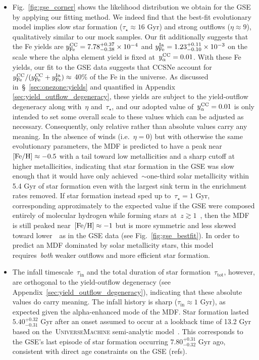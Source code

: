 \documentclass[ms.tex]{subfiles}
\begin{document}
\begin{itemize}
	\item Fig.~\ref{fig:gse_corner} shows the likelihood distribution we obtain
	for the GSE by applying our fitting method.
	We indeed find that the best-fit evolutionary model implies slow star
	formation ($\tau_\star \approx 16$ Gyr) and strong outflows
	($\eta \approx 9$), qualitatively similar to our mock samples.
	Our fit additionally suggests that the Fe yields are
	$y_\text{Fe}^\text{CC} = 7.78^{+0.37}_{-0.38}\times10^{-4}$ and
	$y_\text{Fe}^\text{Ia} = 1.23^{+0.11}_{-0.10}\times10^{-3}$ on the scale where the alpha
	element yield is fixed at~$y_\alpha^\text{CC} = 0.01$.
	With these Fe yields, our fit to the GSE data suggests that CCSNe account
	for~$y_\text{Fe}^\text{CC} / (y_\text{Fe}^\text{CC} + y_\text{Fe}^\text{Ia}) \approx$ 40\% of the Fe in the universe.
	As discussed in~\S~\ref{sec:onezone:yields} and quantified in Appendix
	\ref{sec:yield_outflow_degeneracy}, these yields are subject to the
	yield-outflow degeneracy along with~$\eta$ and~$\tau_\star$, and our
	adopted value of~$y_\alpha^\text{CC} = 0.01$ is only intended to set some overall scale
	to these values which can be adjusted as necessary.
	Consequently, only relative rather than absolute values carry any meaning.
	In the absence of winds (i.e.~$\eta = 0$) but with otherwise the same
	evolutionary parameters, the MDF is predicted to have a peak
	near~$\text{[Fe/H]} \approx -0.5$ with a tail toward low metallicities and a
	sharp cutoff at higher metallicities, indicating that star formation in the
	GSE was slow enough that it would have only achieved~$\sim$one-third solar
	metallicity within 5.4 Gyr of star formation even with the largest sink
	term in the enrichment rates removed.
	If star formation instead sped up to~$\tau_\star = 1$ Gyr, corresponding
	approximately to the expected value if the GSE were composed entirely of
	molecular hydrogen while forming stars at~$z \gtrsim 1$~\citep{Tacconi2018},
	then the MDF is still peaked near~$\text{[Fe/H]} \approx -1$ but is more symmetric
	and less skewed toward lower~\feh~as in the GSE data (see
	Fig.~\ref{fig:gse_bestfit}).
	In order to predict an MDF dominated by solar metallicity stars, this model
	requires~\textit{both} weaker outflows and more efficient star formation.

	\item The infall timescale~$\tau_\text{in}$ and the total duration of
	star formation~$\tau_\text{tot}$, however, are orthogonal to the
	yield-outflow degeneracy (see Appendix~\ref{sec:yield_outflow_degeneracy}),
	indicating that these absolute values do carry meaning.
	The infall history is sharp ($\tau_\text{in} \approx 1$ Gyr), as expected
	given the alpha-enhanced mode of the MDF.
	Star formation lasted~$5.40^{+0.32}_{-0.31}$ Gyr after an onset assumed to
	occur at a lookback time of 13.2 Gyr based on the~\textsc{UniverseMachine}
	semi-analytic model~\citep[][see discussion
	in~\S~\ref{sec:mocks:fiducial}]{Behroozi2019}.
	This corresponds to the GSE's last episode of star formation occurring
	$7.80^{+0.31}_{-0.32}$ Gyr ago, consistent with direct age constraints on
	the GSE (refs).


\end{itemize}
\end{document}
